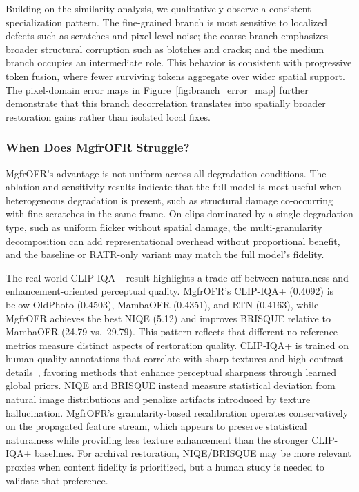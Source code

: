 \documentclass[symmetry,article,submit,pdftex,moreauthors]{Definitions/mdpi}
\begin{document}
Building on the similarity analysis, we qualitatively observe a consistent specialization pattern. The fine-grained branch is most sensitive to localized defects such as scratches and pixel-level noise; the coarse branch emphasizes broader structural corruption such as blotches and cracks; and the medium branch occupies an intermediate role. This behavior is consistent with progressive token fusion, where fewer surviving tokens aggregate over wider spatial support. The pixel-domain error maps in Figure~\ref{fig:branch_error_map} further demonstrate that this branch decorrelation translates into spatially broader restoration gains rather than isolated local fixes.

\subsubsection{When Does MgfrOFR Struggle?}
\label{subsec:failure}

MgfrOFR's advantage is not uniform across all degradation conditions. The ablation and sensitivity results indicate that the full model is most useful when heterogeneous degradation is present, such as structural damage co-occurring with fine scratches in the same frame. On clips dominated by a single degradation type, such as uniform flicker without spatial damage, the multi-granularity decomposition can add representational overhead without proportional benefit, and the baseline or RATR-only variant may match the full model's fidelity.

The real-world CLIP-IQA+ result highlights a trade-off between naturalness and enhancement-oriented perceptual quality. MgfrOFR's CLIP-IQA+ (0.4092) is below OldPhoto (0.4503), MambaOFR (0.4351), and RTN (0.4163), while MgfrOFR achieves the best NIQE (5.12) and improves BRISQUE relative to MambaOFR (24.79 vs.\ 29.79). This pattern reflects that different no-reference metrics measure distinct aspects of restoration quality. CLIP-IQA+ is trained on human quality annotations that correlate with sharp textures and high-contrast details~\cite{wang2023clipiqa}, favoring methods that enhance perceptual sharpness through learned global priors. NIQE and BRISQUE instead measure statistical deviation from natural image distributions and penalize artifacts introduced by texture hallucination. MgfrOFR's granularity-based recalibration operates conservatively on the propagated feature stream, which appears to preserve statistical naturalness while providing less texture enhancement than the stronger CLIP-IQA+ baselines. For archival restoration, NIQE/BRISQUE may be more relevant proxies when content fidelity is prioritized, but a human study is needed to validate that preference.
\end{document}
